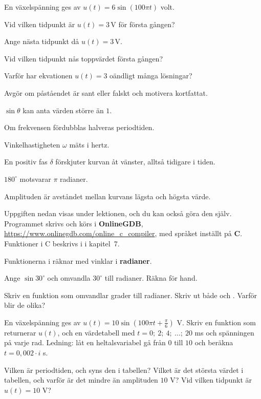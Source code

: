 En växelspänning ges av $u(t) = 6\sin(100\pi t)$ volt.
\begin{parts}
  \item Vid vilken tidpunkt är $u(t) = 3\,\text{V}$ för första gången?
  \item Ange nästa tidpunkt då $u(t) = 3\,\text{V}$.
  \item Vid vilken tidpunkt nås toppvärdet första gången?
  \item Varför har ekvationen $u(t) = 3$ oändligt många lösningar?
\end{parts}

Avgör om påståendet är sant eller falskt och motivera kortfattat.
\begin{parts}
  \item $\sin\theta$ kan anta värden större än $1$.
  \item Om frekvensen fördubblas halveras periodtiden.
  \item Vinkelhastigheten $\omega$ mäts i hertz.
  \item En positiv fas $\delta$ förskjuter kurvan åt vänster, alltså tidigare i tiden.
  \item $180^{\circ}$ motsvarar $\pi$ radianer.
  \item Amplituden är avståndet mellan kurvans lägsta och högsta värde.
\end{parts}

Uppgiften nedan visas under lektionen, och du kan också göra den själv. Programmet skrivs och körs i
\textbf{OnlineGDB}, \url{https://www.onlinegdb.com/online_c_compiler}, med språket inställt på
\textbf{C}. Funktioner i C beskrivs i  i kapitel~7.

Funktionerna i  räknar med vinklar i \textbf{radianer}.
\begin{parts}
  \item Ange $\sin 30^{\circ}$ och omvandla $30^{\circ}$ till radianer. Räkna för hand.
  \item Skriv en funktion  som omvandlar grader till
    radianer. Skriv ut både  och . Varför blir de
    olika?
  \item En växelspänning ges av $u(t) = 10\sin\left(100\pi t + \frac{\pi}{6}\right)$ V. Skriv en
    funktion  som returnerar $u(t)$, och en värdetabell med
    $t = 0;\ 2;\ 4;\ \ldots;\ 20$ ms och spänningen på varje rad. Ledning: låt en heltalsvariabel
     gå från $0$ till $10$ och beräkna $t = 0{,}002 \cdot i$ s.
  \item Vilken är periodtiden, och syns den i tabellen? Vilket är det största värdet i tabellen,
    och varför är det mindre än amplituden $10$ V? Vid vilken tidpunkt är $u(t) = 10$ V?
\end{parts}
